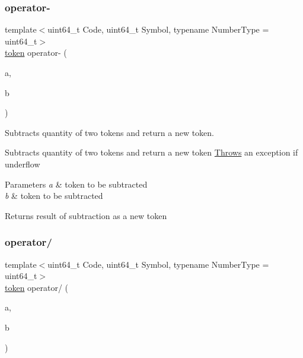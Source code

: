 \subsubsection{\texorpdfstring{operator-\/}{operator-}}
{\footnotesize\ttfamily template$<$uint64\+\_\+t Code, uint64\+\_\+t Symbol, typename Number\+Type  = uint64\+\_\+t$>$ \\
\mbox{\hyperlink{classaacio_1_1token}{token}} operator-\/ (\begin{DoxyParamCaption}\item[{const \mbox{\hyperlink{classaacio_1_1token}{token}}$<$ Code, Symbol, Number\+Type $>$ \&}]{a,  }\item[{const \mbox{\hyperlink{classaacio_1_1token}{token}}$<$ Code, Symbol, Number\+Type $>$ \&}]{b }\end{DoxyParamCaption})\hspace{0.3cm}{\ttfamily [friend]}}



Subtracts quantity of two tokens and return a new token. 

Subtracts quantity of two tokens and return a new token \mbox{\hyperlink{struct_throws}{Throws}} an exception if underflow 
\begin{DoxyParams}{Parameters}
{\em a} & token to be subtracted \\
\hline
{\em b} & token to be subtracted \\
\hline
\end{DoxyParams}
\begin{DoxyReturn}{Returns}
result of subtraction as a new token 
\end{DoxyReturn}
\mbox{\label{classaacio_1_1token_a4dd26892eab5e2694462009f78066779}} 
\subsubsection{\texorpdfstring{operator/}{operator/}\hspace{0.1cm}{\footnotesize\ttfamily [1/2]}}
{\footnotesize\ttfamily template$<$uint64\+\_\+t Code, uint64\+\_\+t Symbol, typename Number\+Type  = uint64\+\_\+t$>$ \\
\mbox{\hyperlink{classaacio_1_1token}{token}} operator/ (\begin{DoxyParamCaption}\item[{const \mbox{\hyperlink{classaacio_1_1token}{token}}$<$ Code, Symbol, Number\+Type $>$ \&}]{a,  }\item[{uint64\+\_\+t}]{b }\end{DoxyParamCaption})\hspace{0.3cm}{\ttfamily [friend]}}



